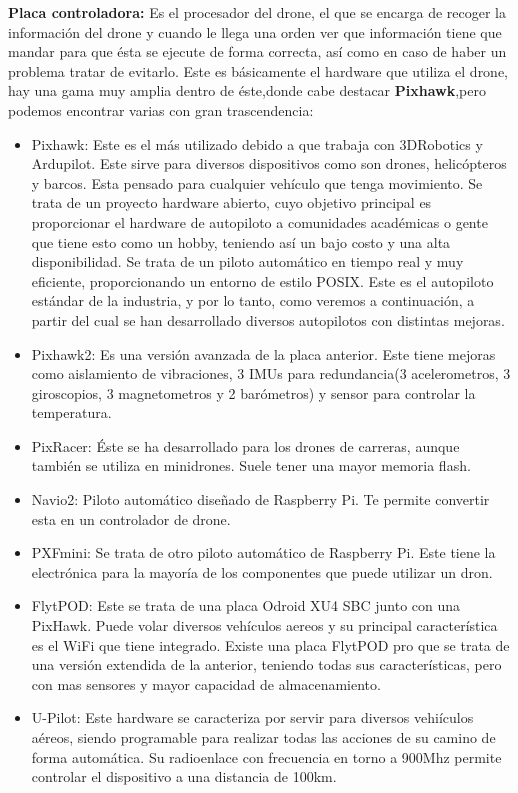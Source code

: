\hspace{1 cm}\textbf{Placa controladora:} Es el procesador del drone, el que se encarga de recoger la informaci\'on del drone y cuando le llega una orden ver que informaci\'on tiene que mandar para que \'esta se ejecute de forma correcta, as\'i como en caso de haber un problema tratar de evitarlo. Este es b\'asicamente el hardware que utiliza el drone, hay una gama muy amplia dentro de \'este,donde cabe destacar \textbf{Pixhawk},pero podemos encontrar varias con gran trascendencia: 
	\begin{itemize}
		\item Pixhawk: Este es el m\'as utilizado debido a que trabaja con 3DRobotics y Ardupilot. Este sirve para diversos dispositivos como son drones, helic\'opteros y barcos. Esta pensado para cualquier veh\'iculo que tenga movimiento.  Se trata de un proyecto hardware abierto, cuyo objetivo principal es proporcionar el hardware de autopiloto a comunidades acad\'emicas o gente que tiene esto como un hobby, teniendo as\'i un bajo costo y una alta disponibilidad. Se trata de un piloto autom\'atico en tiempo real y muy eficiente, proporcionando un entorno de estilo POSIX. Este es el autopiloto est\'andar de la industria, y por lo tanto, como veremos a continuaci\'on, a partir del cual se han desarrollado diversos autopilotos con distintas mejoras. 

		\item Pixhawk2: Es una versi\'on avanzada de la placa anterior. Este tiene mejoras como aislamiento de vibraciones, 3 IMUs para redundancia(3 acelerometros, 3 giroscopios, 3 magnetometros y 2 bar\'ometros) y sensor para controlar la temperatura. 

		\item PixRacer: \'Este se ha desarrollado para los drones de carreras, aunque tambi\'en se utiliza en minidrones. Suele tener una mayor memoria flash.

		\item Navio2: Piloto autom\'atico diseñado de Raspberry Pi. Te permite convertir esta en un controlador de drone. 

		\item PXFmini: Se trata de otro piloto autom\'atico de Raspberry Pi. Este tiene la electr\'onica para la mayor\'ia de los componentes que puede utilizar un dron. 

		\item FlytPOD: Este se trata de una placa Odroid XU4 SBC junto con una PixHawk. Puede volar diversos veh\'iculos aereos y su principal caracter\'istica es el WiFi que tiene integrado. Existe una placa FlytPOD pro que se trata de una versi\'on extendida de la anterior, teniendo todas sus caracter\'isticas, pero con mas sensores y mayor capacidad de almacenamiento. 

		\item U-Pilot: Este hardware se caracteriza por servir para diversos vehi\'iculos a\'ereos, siendo programable para realizar todas las acciones de su camino de forma autom\'atica. Su radioenlace con frecuencia en torno a 900Mhz permite controlar el dispositivo a una distancia de 100km. 
	\end{itemize}

